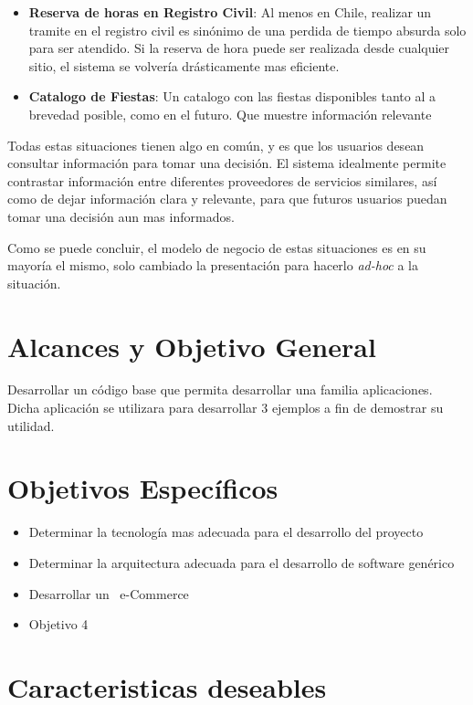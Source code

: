 \begin{itemize}
	\item \textbf{Reserva de horas en Registro Civil}: Al menos en Chile, realizar un tramite en el registro civil es sinónimo de una perdida de tiempo absurda solo para ser atendido. Si la reserva de hora puede ser realizada desde cualquier sitio, el sistema se volvería drásticamente mas eficiente.
	
	\item \textbf{Catalogo de Fiestas}: Un catalogo con las fiestas disponibles tanto al a brevedad posible, como en el futuro. Que muestre información relevante 
	
\end{itemize}

Todas estas situaciones tienen algo en común, y es que los usuarios desean consultar información para tomar una decisión. El sistema idealmente permite contrastar información entre diferentes proveedores de servicios similares, así como de dejar información clara y relevante, para que futuros usuarios puedan tomar una decisión aun mas informados.

Como se puede concluir, el modelo de negocio de estas situaciones es en su mayoría el mismo, solo cambiado la presentación para hacerlo \textit{ad-hoc} a la situación.

\section{Alcances y Objetivo General}\label{cap:intro:alcances}
Desarrollar un código base que permita desarrollar una familia aplicaciones. Dicha aplicación se utilizara para desarrollar 3 ejemplos a fin de demostrar su utilidad.

\section{Objetivos Específicos}\label{cap:intro:objetivos}
\begin{itemize}
	\item Determinar la tecnología mas adecuada para el desarrollo del proyecto
	\item Determinar la arquitectura adecuada para el desarrollo de software genérico
	\item Desarrollar un \ e-Commerce
	\item Objetivo 4
\end{itemize}

\section{Caracteristicas deseables}\label{cap:intro:alcance}

